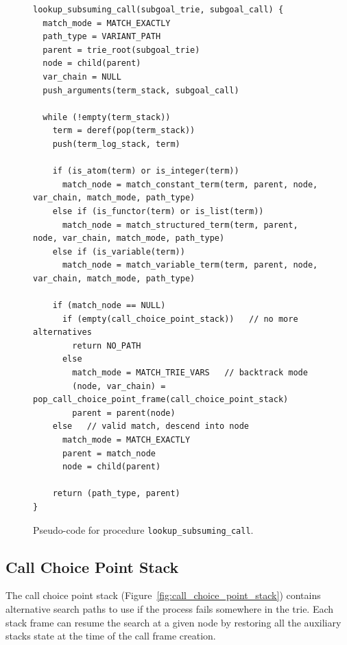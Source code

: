 \begin{figure}[ht]
\begin{Verbatim}
lookup_subsuming_call(subgoal_trie, subgoal_call) {
  match_mode = MATCH_EXACTLY
  path_type = VARIANT_PATH
  parent = trie_root(subgoal_trie)
  node = child(parent)
  var_chain = NULL
  push_arguments(term_stack, subgoal_call)

  while (!empty(term_stack))
    term = deref(pop(term_stack))
    push(term_log_stack, term)
  
    if (is_atom(term) or is_integer(term))
      match_node = match_constant_term(term, parent, node, var_chain, match_mode, path_type)
    else if (is_functor(term) or is_list(term))
      match_node = match_structured_term(term, parent, node, var_chain, match_mode, path_type)
    else if (is_variable(term))
      match_node = match_variable_term(term, parent, node, var_chain, match_mode, path_type)
  
    if (match_node == NULL)
      if (empty(call_choice_point_stack))   // no more alternatives
        return NO_PATH
      else
        match_mode = MATCH_TRIE_VARS   // backtrack mode
        (node, var_chain) = pop_call_choice_point_frame(call_choice_point_stack)
        parent = parent(node)
    else   // valid match, descend into node
      match_mode = MATCH_EXACTLY
      parent = match_node
      node = child(parent)
      
    return (path_type, parent)
}
\end{Verbatim}
\caption{Pseudo-code for procedure \texttt{lookup\_subsuming\_call}.}
\label{fig:lookup_subsuming_call}
\end{figure}

\subsection{Call Choice Point Stack}

The call choice point stack (Figure~\ref{fig:call_choice_point_stack}) contains alternative
search paths to use if the process fails somewhere in the trie.
Each stack frame can resume the search at a given node by restoring all the auxiliary stacks state at the time
of the call frame creation.

